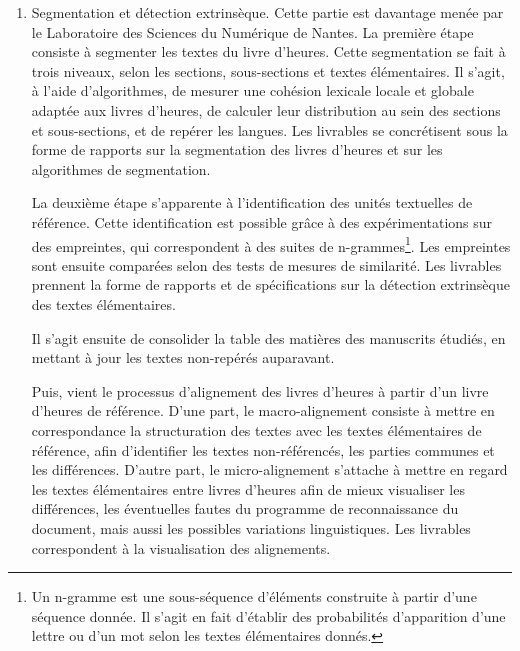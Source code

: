 \documentclass[a4paper,12pt,twoside]{book}
\begin{document}
\begin{enumerate}
	    Enfin, la dernière étape consiste à développer une interface graphique pour traiter le corpus. Il s'agit de pouvoir appliquer la chaîne de traitement à tous les manuscrits et de présenter les résultats dans une interface web\footcite[p. 13-14]{HORAE_projet}. Cette étape se concrétise dans la mise à disposition de l'interface Arkindex utilisée pendant le stage. \\
	    
	    \item \og Segmentation et détection extrinsèque\fg{}. Cette partie est davantage menée par le Laboratoire des Sciences du Numérique de Nantes. La première étape consiste à segmenter les textes du livre d'heures. Cette segmentation se fait à trois niveaux, selon les sections, sous-sections et textes élémentaires. Il s'agit, à l'aide d'algorithmes, de mesurer une cohésion lexicale locale et globale adaptée aux livres d'heures, de calculer leur distribution au sein des sections et sous-sections, et de repérer les langues. Les livrables se concrétisent sous la forme de rapports sur la segmentation des livres d'heures et sur les algorithmes de segmentation.
	    
	    La deuxième étape s'apparente à l'identification des unités textuelles de référence. Cette identification est possible grâce à des expérimentations sur des empreintes, qui correspondent à des suites de n-grammes\footnote{Un n-gramme est une sous-séquence d'éléments construite à partir d'une séquence donnée. Il s'agit en fait d'établir des probabilités d'apparition d'une lettre ou d'un mot selon les textes élémentaires donnés.}. Les empreintes sont ensuite comparées selon des tests de mesures de similarité. Les livrables prennent la forme de rapports et de spécifications sur la détection extrinsèque des textes élémentaires. 
	    
	    Il s'agit ensuite de consolider la \og table des matières\fg{} des manuscrits étudiés, en mettant à jour les textes non-repérés auparavant. 
	    
	    Puis, vient le processus d'alignement des livres d'heures à partir d'un livre d'heures de référence. D'une part, le macro-alignement consiste à mettre en correspondance la structuration des textes avec les textes élémentaires de référence, afin d'identifier les textes non-référencés, les parties communes et les différences. D'autre part, le micro-alignement s'attache à mettre en regard les textes élémentaires entre livres d'heures afin de mieux visualiser les différences, les éventuelles fautes du programme de reconnaissance du document, mais aussi les possibles variations linguistiques. Les livrables correspondent à la visualisation des alignements. 
	    

\end{enumerate}
\end{document}
